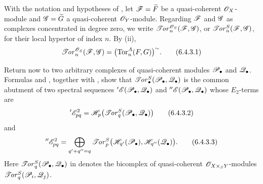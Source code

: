 \begin{env}[6.4.3]
\label{III.6.4.3}
With the notation and hypotheses of , let
$\mathscr{F}=\widetilde F$ be a quasi-coherent $\mathscr{O}_X$-module and
$\mathscr{G}=\widetilde G$ a quasi-coherent $\mathscr{O}_Y$-module.  Regarding
$\mathscr{F}$ and $\mathscr{G}$ as complexes concentrated in degree zero, we
write $\mathscr{T}\!\mathit{or}_n^{\mathscr{O}_S}(\mathscr{F},\mathscr{G})$, or
$\mathscr{T}\!\mathit{or}_n^S(\mathscr{F},\mathscr{G})$, for their local hypertor of index $n$.
By (ii),
\[
  \mathscr{T}\!\mathit{or}_n^{\mathscr{O}_S}(\mathscr{F},\mathscr{G})
  =
  \bigl(\operatorname{Tor}_n^A(F,G)\bigr)^{\sim}.
  \tag{6.4.3.1}\label{III.6.4.3.1}
\]

Return now to two arbitrary complexes of quasi-coherent modules
$\mathscr{P}_\bullet$ and $\mathscr{Q}_\bullet$.  Formulas
 and , together with
, show that
$\mathscr{T}\!\mathit{or}_\bullet^S(\mathscr{P}_\bullet,\mathscr{Q}_\bullet)$ is the common abutment
of two spectral sequences
$'\mathscr{E}(\mathscr{P}_\bullet,\mathscr{Q}_\bullet)$ and
$''\mathscr{E}(\mathscr{P}_\bullet,\mathscr{Q}_\bullet)$ whose $E_2$-terms are
\[
  '\mathscr{E}_{pq}^2
  =
  \mathscr{H}_p\bigl(\mathscr{T}\!\mathit{or}_q^S(\mathscr{P}_\bullet,\mathscr{Q}_\bullet)\bigr)
  \tag{6.4.3.2}\label{III.6.4.3.2}
\]
and
\[
  ''\mathscr{E}_{pq}^2
  =
  \bigoplus_{q'+q''=q}
  \mathscr{T}\!\mathit{or}_p^S
  \bigl(\mathscr{H}_{q'}(\mathscr{P}_\bullet),
        \mathscr{H}_{q''}(\mathscr{Q}_\bullet)\bigr).
  \tag{6.4.3.3}\label{III.6.4.3.3}
\]
Here $\mathscr{T}\!\mathit{or}_q^S(\mathscr{P}_\bullet,\mathscr{Q}_\bullet)$ in
 denotes the bicomplex of quasi-coherent
$\mathscr{O}_{X\times_SY}$-modules
$\mathscr{T}\!\mathit{or}_q^S(\mathscr{P}_i,\mathscr{Q}_j)$.
\end{env}

